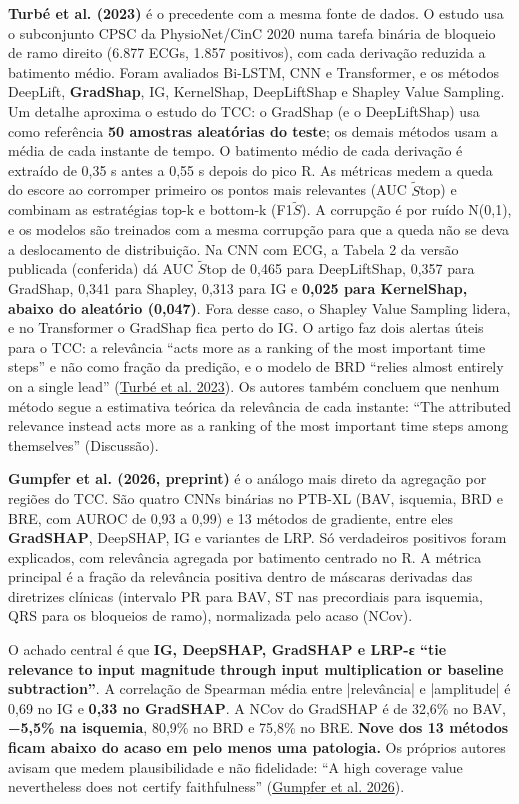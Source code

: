 \documentclass[11pt,a4paper]{article}
\begin{document}
\textbf{Turbé et al. (2023)} é o precedente com a mesma fonte de dados. O estudo usa o subconjunto CPSC da PhysioNet/CinC 2020 numa tarefa binária de bloqueio de ramo direito (6.877 ECGs, 1.857 positivos), com cada derivação reduzida a batimento médio. Foram avaliados Bi-LSTM, CNN e Transformer, e os métodos DeepLift, \textbf{GradShap}, IG, KernelShap, DeepLiftShap e Shapley Value Sampling. Um detalhe aproxima o estudo do TCC: o GradShap (e o DeepLiftShap) usa como referência \textbf{50 amostras aleatórias do teste}; os demais métodos usam a média de cada instante de tempo. O batimento médio de cada derivação é extraído de 0,35 s antes a 0,55 s depois do pico R. As métricas medem a queda do escore ao corromper primeiro os pontos mais relevantes (AUC $\tilde{S}$top) e combinam as estratégias top-k e bottom-k (F1$\tilde{S}$). A corrupção é por ruído N(0,1), e os modelos são treinados com a mesma corrupção para que a queda não se deva a deslocamento de distribuição. Na CNN com ECG, a Tabela 2 da versão publicada (conferida) dá AUC $\tilde{S}$top de 0,465 para DeepLiftShap, 0,357 para GradShap, 0,341 para Shapley, 0,313 para IG e \textbf{0,025 para KernelShap, abaixo do aleatório (0,047)}. Fora desse caso, o Shapley Value Sampling lidera, e no Transformer o GradShap fica perto do IG. O artigo faz dois alertas úteis para o TCC: a relevância ``acts more as a ranking of the most important time steps'' e não como fração da predição, e o modelo de BRD ``relies almost entirely on a single lead'' (\href{https://doi.org/10.1038/s42256-023-00620-w}{Turbé et al. 2023}). Os autores também concluem que nenhum método segue a estimativa teórica da relevância de cada instante: ``The attributed relevance instead acts more as a ranking of the most important time steps among themselves'' (Discussão).

\textbf{Gumpfer et al. (2026, preprint)} é o análogo mais direto da agregação por regiões do TCC. São quatro CNNs binárias no PTB-XL (BAV, isquemia, BRD e BRE, com AUROC de 0,93 a 0,99) e 13 métodos de gradiente, entre eles \textbf{GradSHAP}, DeepSHAP, IG e variantes de LRP. Só verdadeiros positivos foram explicados, com relevância agregada por batimento centrado no R. A métrica principal é a fração da relevância positiva dentro de máscaras derivadas das diretrizes clínicas (intervalo PR para BAV, ST nas precordiais para isquemia, QRS para os bloqueios de ramo), normalizada pelo acaso (NCov).

O achado central é que \textbf{IG, DeepSHAP, GradSHAP e LRP-ε ``tie relevance to input magnitude through input multiplication or baseline subtraction''}. A correlação de Spearman média entre |relevância| e |amplitude| é 0,69 no IG e \textbf{0,33 no GradSHAP}. A NCov do GradSHAP é de 32,6\% no BAV, \textbf{−5,5\% na isquemia}, 80,9\% no BRD e 75,8\% no BRE. \textbf{Nove dos 13 métodos ficam abaixo do acaso em pelo menos uma patologia.} Os próprios autores avisam que medem plausibilidade e não fidelidade: ``A high coverage value nevertheless does not certify faithfulness'' (\href{https://arxiv.org/abs/2607.24035}{Gumpfer et al. 2026}).
\end{document}
